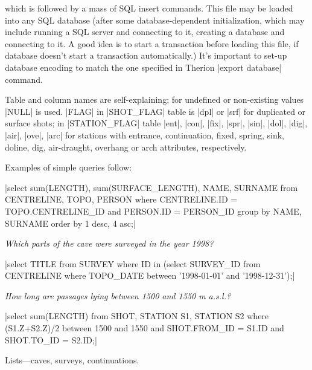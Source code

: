 which is followed by a mass of SQL insert commands. This file may be loaded into any SQL database (after some database-dependent initialization, which may include running a SQL server and connecting to it, creating a database and connecting to it. A good idea is to start a transaction before loading this file, if database doesn't start a transaction automatically.) It's important to set-up database encoding to match the one specified in Therion |export database| command. 

\midinsert

\centerline{} \endinsert

%
Table and column names are self-explaining; for undefined or non-existing values |NULL| is used. |FLAG| in |SHOT_FLAG| table is |dpl| or |srf| for duplicated or surface shots; in |STATION_FLAG| table |ent|, |con|, |fix|, |spr|, |sin|, |dol|, |dig|, |air|, |ove|, |arc| for stations with entrance, continuation, fixed, spring, sink, doline, dig, air-draught, overhang or arch attributes, respectively. 

Examples of simple queries follow: 


|select sum(LENGTH), sum(SURFACE_LENGTH), NAME, SURNAME from CENTRELINE, TOPO, PERSON where CENTRELINE.ID = TOPO.CENTRELINE_ID and PERSON.ID = PERSON_ID group by NAME, SURNAME order by 1 desc, 4 asc;| 

{\it Which parts of the cave were surveyed in the year 1998?} 

|select TITLE from SURVEY where ID in (select SURVEY_ID from CENTRELINE where TOPO_DATE between '1998-01-01' and '1998-12-31');| 

{\it How long are passages lying between 1500 and 1550 m a.s.l.?} 

|select sum(LENGTH) from SHOT, STATION S1, STATION S2 where (S1.Z+S2.Z)/2 between 1500 and 1550 and SHOT.FROM_ID = S1.ID and SHOT.TO_ID = S2.ID;| 

\subsubchapter Lists---caves, surveys, continuations. 

